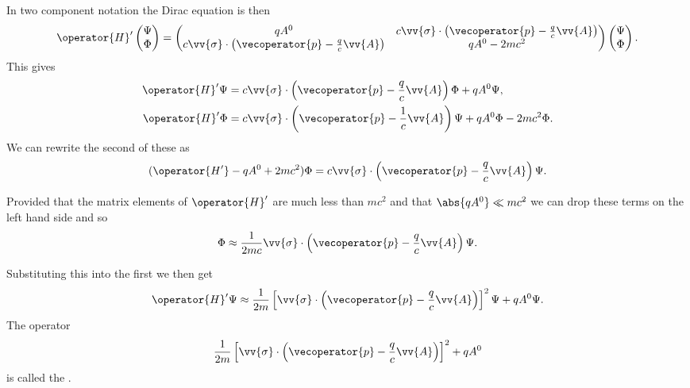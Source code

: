 \documentclass[fleqn]{NotesClass}
\newcommand*{\hamiltonian}{H}
\begin{document}
    In two component notation the Dirac equation is then
    \begin{equation}
        \operator{\hamiltonian}'
        \begin{pmatrix}
            \Psi\\ \Phi
        \end{pmatrix}
        =
        \begin{pmatrix}
            qA^0 & c\vv{\sigma} \cdot \left( \vecoperator{p} - \frac{q}{c}\vv{A} \right)\\
            c\vv{\sigma} \cdot \left( \vecoperator{p} - \frac{q}{c}\vv{A} \right) & qA^0 - 2mc^2
        \end{pmatrix}
        \begin{pmatrix}
            \Psi\\ \Phi
        \end{pmatrix}
        .
    \end{equation}
    This gives
    \begin{align}
        \operator{\hamiltonian}'\Psi &= c\vv{\sigma} \cdot \left( \vecoperator{p} - \frac{q}{c}\vv{A} \right) \Phi + qA^0\Psi,\\
        \operator{\hamiltonian}'\Phi &= c\vv{\sigma} \cdot \left( \vecoperator{p} - \frac{1}{c}\vv{A} \right) \Psi + qA^0\Phi - 2mc^2\Phi.
    \end{align}
    We can rewrite the second of these as
    \begin{equation}
        (\operator{H'} - qA^0 + 2mc^2)\Phi = c\vv{\sigma} \cdot \left( \vecoperator{p} - \frac{q}{c}\vv{A} \right) \Psi.
    \end{equation}
    
    Provided that the matrix elements of \(\operator{\hamiltonian}'\) are much less than \(mc^2\) and that \(\abs{qA^0} \ll mc^2\) we can drop these terms on the left hand side and so
    \begin{equation}
        \Phi \approx \frac{1}{2mc} \vv{\sigma} \cdot \left( \vecoperator{p} - \frac{q}{c}\vv{A} \right)\Psi.
    \end{equation}
    
    Substituting this into the first we then get
    \begin{equation}\label{eqn:precursor to pauli equation}
        \operator{\hamiltonian}'\Psi \approx \frac{1}{2m}\left[ \vv{\sigma} \cdot \left( \vecoperator{p} - \frac{q}{c}\vv{A} \right) \right]^2 \Psi + qA^0 \Psi.
    \end{equation}
    The operator
    \begin{equation}
        \frac{1}{2m}\left[ \vv{\sigma} \cdot \left( \vecoperator{p} - \frac{q}{c}\vv{A} \right) \right]^2 + qA^0
    \end{equation}
    is called the .
    
\end{document}
